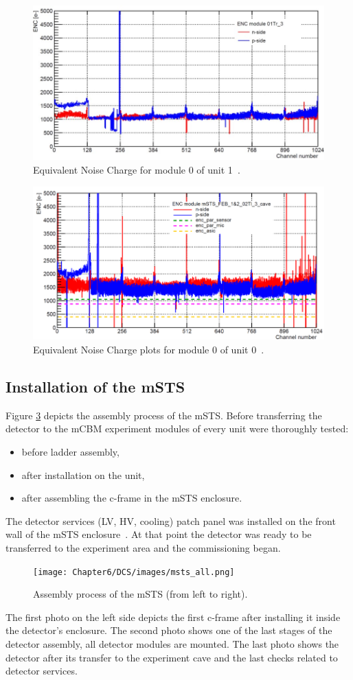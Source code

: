 \begin{figure}[h!]
\centering
\includegraphics[width=0.6\columnwidth]{Chapter6/DCS/images/U0M1_ENC.jpg}
\caption{Equivalent Noise Charge for module 0 of unit 1~\cite{RodriguezRodriguez2020}.}
\label{fig_msts_ENC1}
\end{figure}

\begin{figure}[h!]
\centering
\includegraphics[width=0.6\columnwidth]{Chapter6/DCS/images/U1M1_ENC.png}
\caption{Equivalent Noise Charge plots for module 0 of unit 0~\cite{RodriguezRodriguez2020}.}
\label{fig_msts_ENC2}
\end{figure}
\newpage
\subsection{Installation of the mSTS}
Figure \ref{fig_msts_state} depicts the assembly process of the \gls{mSTS}. Before transferring the detector to the \gls{mCBM} experiment modules of every unit were thoroughly tested:
\begin{itemize}
    \item before ladder assembly,
    \item after installation on the unit,
    \item after assembling the c-frame in the mSTS enclosure.
\end{itemize}
The detector services (\gls{LV}, \gls{HV}, cooling) patch panel was installed on the front wall of the \gls{mSTS} enclosure~\cite{tekli1}. At that point the detector was ready to be transferred to the experiment area and the commissioning began.

\begin{figure}[h!]
\centering
\texttt{[image: Chapter6/DCS/images/msts\_all.png]}
\caption{Assembly process of the \gls{mSTS} (from left to right).}
\label{fig_msts_state}
\end{figure}
 The first photo on the left side depicts the first c-frame after installing it inside the detector's enclosure. The second photo shows one of the last stages of the detector assembly, all detector modules are mounted. The last photo shows the detector after its transfer to the experiment cave and the last checks related to detector services. %

